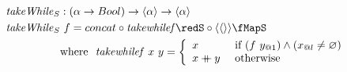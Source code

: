 \documentclass[preview]{standalone}
\begin{document}
\begin{align*}
  \mathit{takeWhile}_S &: (\alpha \rightarrow Bool) \rightarrow \vect{\alpha} \rightarrow \vect{\alpha} \\
  \mathit{takeWhile}_S &\ f = concat \circ \mathit{takewhilef} \redS \circ \vect{\vect{}} \fMapS\\
         & \text{where}\ \ \mathit{takewhilef}\ x\ y = 
           \left\{\begin{array}{ll}
                    x & \text{ if } (f\ y_{@1}) \wedge (x_{@l} \neq \varnothing)\\
                    x \fcat y & \text{ otherwise}
                  \end{array}
           \right.\\
\end{align*}
\end{document}
